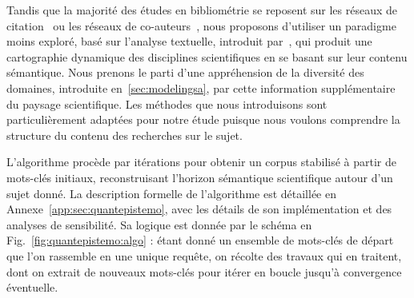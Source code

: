 Tandis que la majorité des études en bibliométrie se reposent sur les réseaux de citation~\cite{newman2014prediction} ou les réseaux de co-auteurs~\cite{sarigol2014predicting}, nous proposons d'utiliser un paradigme moins exploré, basé sur l'analyse textuelle, introduit par~\cite{chavalarias2013phylomemetic}, qui produit une cartographie dynamique des disciplines scientifiques en se basant sur leur contenu sémantique. Nous prenons le parti d'une appréhension de la diversité des domaines, introduite en~\ref{sec:modelingsa}, par cette information supplémentaire du paysage scientifique. Les méthodes que nous introduisons sont particulièrement adaptées pour notre étude puisque nous voulons comprendre la structure du contenu des recherches sur le sujet.







L'algorithme procède par itérations pour obtenir un corpus stabilisé à partir de mots-clés initiaux, reconstruisant l'horizon sémantique scientifique autour d'un sujet donné. La description formelle de l'algorithme est détaillée en Annexe~\ref{app:sec:quantepistemo}, avec les détails de son implémentation et des analyses de sensibilité. Sa logique est donnée par le schéma en Fig.~\ref{fig:quantepistemo:algo} : étant donné un ensemble de mots-clés de départ que l'on rassemble en une unique requête, on récolte des travaux qui en traitent, dont on extrait de nouveaux mots-clés pour itérer en boucle jusqu'à convergence éventuelle.

